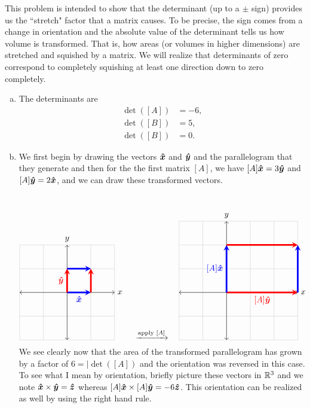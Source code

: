 \documentclass[12pt]{article} %
\begin{document}
\begin{solution} This problem is intended to show that the determinant (up to a $\pm$ sign) provides us the ``stretch" factor that a matrix causes.  To be precise, the sign comes from a change in orientation and the absolute value of the determinant tells us how volume is transformed.  That is, how areas (or volumes in higher dimensions) are stretched and squished by a matrix. We will realize that determinants of zero correspond to completely squishing at least one direction down to zero completely.
    \begin{enumerate}[(a)]
        \item The determinants are
        \begin{align*}
        \det([A]) &= -6,\\
        \det([B]) &= 5,\\
        \det([B]) &= 0.
        \end{align*}
        \item We first begin by drawing the vectors $\boldsymbol{\hat{x}}$ and $\boldsymbol{\hat{y}}$ and the parallelogram that they generate and then for the the first matrix $[A]$, we have $[A]\boldsymbol{\hat{x}} = 3\boldsymbol{\hat{y}}$ and $[A]\boldsymbol{\hat{y}} = 2\boldsymbol{\hat{x}}$, and we can draw these transformed vectors.
        \[
        \begin{tikzpicture}
        \draw[thin,gray!40] (-2,-2) grid (2,2);
        \draw[<->] (-2,0)--(2,0) node[right]{$x$};
        \draw[<->] (0,-2)--(0,2) node[above]{$y$};
        \draw[line width=2pt,blue,-stealth](0,0)--(1,0) node[anchor=north] at (.5,0){$\xhat$};
        \draw[line width=2pt, red, -stealth](0,0)--(0,1) node[anchor=east] at (0,.5){$\yhat$};
        \draw[line width=2pt, blue, -stealth](0,1)--(1,1) node[anchor=north] at (1,4){};
        \draw[line width=2pt, red, -stealth](1,0)--(1,1) node[anchor=south] at (1,4){};
        \end{tikzpicture}
        \quad \xrightarrow{\textrm{apply }[A]} \quad
        \begin{tikzpicture}
        \draw[thin,gray!40] (-2,-2) grid (3,3);
        \draw[<->] (-2,0)--(3,0) node[right]{$x$};
        \draw[<->] (0,-2)--(0,3) node[above]{$y$};
        \draw[line width=2pt,red,-stealth](0,0)--(3,0) node[anchor=north] at (1.5,0){$[A]\yhat$};
        \draw[line width=2pt, blue, -stealth](0,0)--(0,2) node[anchor=east] at (0,1){$[A]\xhat$};
        \draw[line width=2pt, red, -stealth](0,2)--(3,2) node[anchor=north] at (1,4){};
        \draw[line width=2pt, blue, -stealth](3,0)--(3,2) node[anchor=south] at (1,4){};
        \end{tikzpicture}
        \]
        We see clearly now that the area of the transformed parallelogram has grown by a factor of $6=|\det([A])$ and the orientation was reversed in this case. To see what I mean by orientation, briefly picture these vectors in $\mathbb{R}^3$ and we note $\boldsymbol{\hat{x}} \times \boldsymbol{\hat{y}} = \boldsymbol{\hat{z}}$ whereas $[A]\boldsymbol{\hat{x}} \times [A]\boldsymbol{\hat{y}} = -6\boldsymbol{\hat{z}}$.  This orientation can be realized as well by using the right hand rule.
        

\end{enumerate}
\end{solution}
\end{document}
